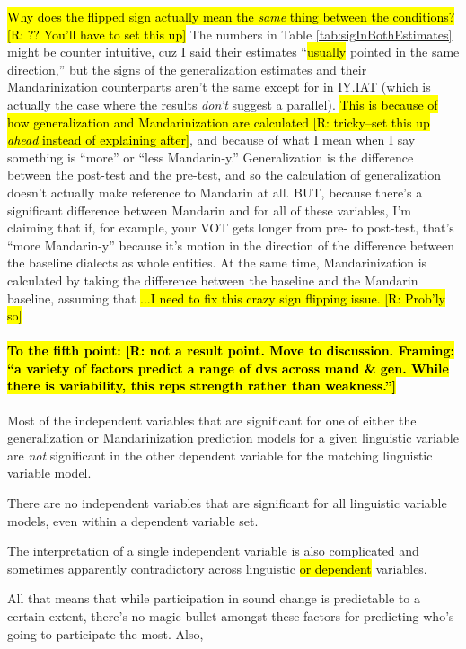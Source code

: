 \hl{Why does the flipped sign actually mean the \emph{same} thing between the conditions? [R: ?? You'll have to set this up]} The numbers in Table \ref{tab:sigInBothEstimates} might be counter intuitive, cuz I said their estimates ``\hl{usually} pointed in the same direction,'' but the signs of the generalization estimates and their Mandarinization counterparts aren't the same except for in IY.IAT (which is actually the case where the results \emph{don't} suggest a parallel). \hl{This is because of how generalization and Mandarinization are calculated [R: tricky--set this up \emph{ahead} instead of explaining after]}, and because of what I mean when I say something is ``more'' or ``less Mandarin-y.'' Generalization is the difference between the \ND{} post-test and the \ND{} pre-test, and so the calculation of generalization doesn't actually make reference to Mandarin at all. BUT, because there's a significant difference between Mandarin and \ND{} for all of these variables, I'm claiming that if, for example, your VOT gets longer from pre- to post-test, that's ``more Mandarin-y'' because it's motion in the direction of the difference between the baseline dialects as whole entities. At the same time, Mandarinization is calculated by taking the difference between the \ND{} baseline and the Mandarin baseline, assuming that \hl{...I need to fix this crazy sign flipping issue. [R: Prob'ly so]}

\paragraph{\hl{To the fifth point: [R: not a result point. Move to discussion. Framing: ``a variety of factors predict a range of dvs across mand \& gen. While there is variability, this reps strength rather than weakness.'']}}
Most of the independent variables that are significant for one of either the generalization or Mandarinization prediction models for a given linguistic variable are \emph{not} significant in the other dependent variable for the matching linguistic variable model.

There are no independent variables that are significant for all linguistic variable models, even within a dependent variable set.

The interpretation of a single independent variable is also complicated and sometimes apparently contradictory across linguistic \hl{or dependent} variables.

All that means that while participation in sound change is predictable to a certain extent, there's no magic bullet amongst these factors for predicting who's going to participate the most. Also, 


